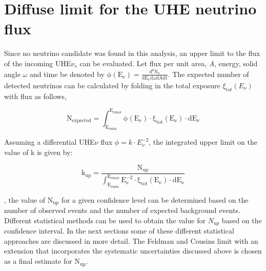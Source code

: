 \section{Diffuse limit for the UHE neutrino flux}
\label{sec:diff_limit}
Since no neutrino candidate was found in this analysis, an upper limit to the flux of the incoming UHE$\nu_s$ can be evaluated. Let flux per unit area, \textit{A}, energy, solid angle $\omega$ and time be denoted by $\mathrm{\phi(E_{\nu}) = \frac{d^6 N_{\nu}}{dE_{\nu}d\omega dA dt}}$. The expected number of detected neutrinos can be calculated by folding in the total exposure $\xi_{tot}(E_{\nu})$ with flux as follows,

\begin{equation}
  \mathrm{N_{expected} = \int_{E_{\nu min}}^{E_{\nu max}} \phi(E_{\nu}) \cdot \xi_{tot}(E_{\nu}) \cdot dE_{\nu}}
\end{equation}

Assuming a differential UHE$\nu$ flux $\phi = k \cdot E_{\nu}^{-2}$, the integrated upper limit on the value of k is given by:

\begin{equation}
  \label{eq:integ_lim}
  \mathrm{k_{up} = \frac{N_{up}}{\int_{E_{\nu min}}^{E_{\nu max}} E_{\nu}^{-2} \cdot \xi_{tot}(E_{\nu}) \cdot dE_{\nu}}}
\end{equation}

, the value of $\mathrm{N_{up}}$ for a given confidence level can be determined based on the number of observed events and the number of expected background events. Different statistical methods can be used to obtain the value for $N_{up}$ based on the confidence interval. In the next sections some of these different statistical approaches are discussed in more detail. The Feldman and Cousins limit with an extension that incorporates the systematic uncertainties discussed above is chosen as a final estimate for $\mathrm{N_{up}}$.


